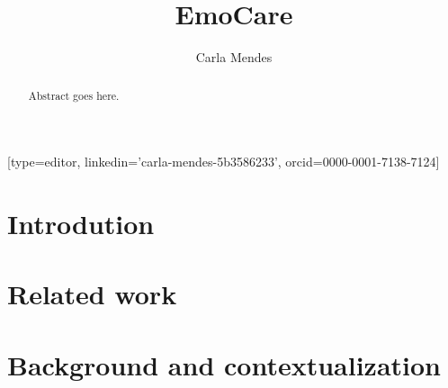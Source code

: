 \documentclass[a4paper,fleqn]{cas-dc}
\begin{document}
\let\WriteBookmarks\relax
\def\floatpagepagefraction{1}
\def\textpagefraction{.001}

\title [mode = title]{EmoCare}                     


\author[1]{Carla Mendes}[type=editor,
		linkedin='carla-mendes-5b3586233',
		orcid=0000-0001-7138-7124]

\address[1]{Computer Science and Communications Research Centre, School of Technology and Management, Polytechnic of Leiria, 2411-901 Leiria, Portugal}

\begin{abstract}
Abstract goes here.


\end{abstract}

%

\begin{keywords}

\end{keywords}


\maketitle

\section{Introdution}
\label{introduction}

\section{Related work}
\label{relatedWork}

\section{Background and contextualization}
\label{backgroundContextualization}
\end{document}
